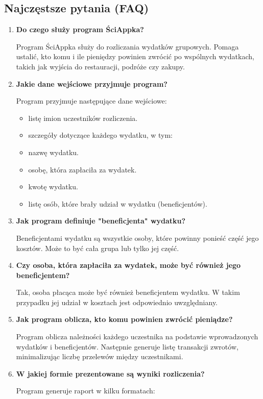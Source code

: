 \documentclass{article}
\begin{document}
\subsection{Najczęstsze pytania (FAQ)}
\begin{enumerate}
\item \textbf{Do czego służy program ŚciAppka?}

Program ŚciAppka służy do rozliczania wydatków grupowych. Pomaga ustalić, kto komu i ile pieniędzy powinien zwrócić po wspólnych wydatkach, takich jak wyjścia do restauracji, podróże czy zakupy.

\item \textbf{Jakie dane wejściowe przyjmuje program?}

Program przyjmuje następujące dane wejściowe:
\begin{itemize}
\item listę imion uczestników rozliczenia.
\item szczegóły dotyczące każdego wydatku, w tym:
\item nazwę wydatku.
\item osobę, która zapłaciła za wydatek.
\item kwotę wydatku.
\item listę osób, które brały udział w wydatku (beneficjentów).
\end{itemize}
\item \textbf{Jak program definiuje "beneficjenta" wydatku?}

Beneficjentami wydatku są wszystkie osoby, które powinny ponieść część jego kosztów. Może to być cała grupa lub tylko jej część.

\item \textbf{Czy osoba, która zapłaciła za wydatek, może być również jego beneficjentem?}

Tak, osoba płacąca może być również beneficjentem wydatku. W takim przypadku jej udział w kosztach jest odpowiednio uwzględniany.

\item \textbf{Jak program oblicza, kto komu powinien zwrócić pieniądze?}

Program oblicza należności każdego uczestnika na podstawie wprowadzonych wydatków i beneficjentów. Następnie generuje listę transakcji zwrotów, minimalizując liczbę przelewów między uczestnikami.

\item \textbf{W jakiej formie prezentowane są wyniki rozliczenia?}

Program generuje raport w kilku formatach:


\end{enumerate}
\end{document}
